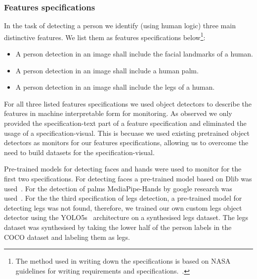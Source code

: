 \subsubsection{Features specifications}
In the task of detecting a person we identify (using human logic) three main distinctive features. We list them as features specifications below\footnote{The method used in writing down the specifications is based on NASA guidelines for writing requirements and specifications.~\cite{NASA_SystemsEngineeringHandbook}.}:
\begin{itemize}
    \item  A person detection in an image shall include the facial landmarks of a human.
    \item A person detection in an image shall include a human palm.
    \item A person detection in an image shall include the legs of a human.
\end{itemize}

For all three listed features specifications we used object detectors to describe the features in machine interpretable form for monitoring. 
%
As observed we only provided the specification-text part of a feature specification and eliminated the usage of a specification-visual. 
%
This is becuase we used existing pretrained object detectors as monitors for our features specifications, allowing us to overcome the need to build datasets for the specification-visual.
%

Pre-trained models for detecting faces and hands were used to monitor for the first two specifications. 
%
For detecting faces a pre-trained model based on Dlib was used~\cite{king2015}.
For the detection of palms MediaPipe-Hands by google research was used~\cite{mediapipe}.
%
For the the third specification of legs detection, a pre-trained model for detecting legs was not found, therefore, we trained our own custom legs object detector using the YOLO5s~\cite{Jocher_YOLOv5_by_Ultralytics_2020} architecture on a synthesised legs dataset. The legs dataset was synthesised by taking the lower half of the person labels in the COCO dataset and labeling them as legs.
%
%
%
